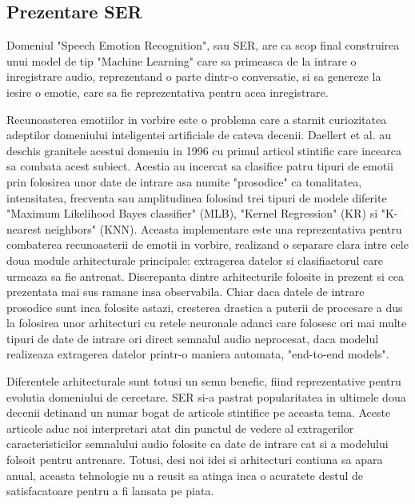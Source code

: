 \documentclass[a4paper,12pt, twoside]{book}
\begin{document}
			\subsection{Prezentare SER}
				Domeniul "Speech Emotion Recognition", sau SER, are ca scop final construirea unui model de tip "Machine Learning" care sa primeasca de la intrare o inregistrare audio, reprezentand o parte dintr-o conversatie, si sa genereze la iesire o emotie, care sa fie reprezentativa pentru acea inregistrare. \par
				Recunoasterea emotiilor in vorbire este o problema care a starnit curiozitatea adeptilor domeniului inteligentei artificiale de cateva decenii. Daellert et al. \cite{dellaert} au deschis granitele acestui domeniu in 1996 cu primul articol stintific care incearca sa combata acest subiect. Acestia au incercat sa clasifice patru tipuri de emotii prin folosirea unor date de intrare asa numite "prosodice" ca tonalitatea, intensitatea, frecventa sau amplitudinea folosind trei tipuri de modele diferite "Maximum Likelihood Bayes classifier" (MLB), "Kernel Regression"  (KR) si "K-nearest neighbors" (KNN). Aceasta implementare este una reprezentativa pentru combaterea recunoasterii de emotii in vorbire, realizand o separare clara intre cele doua module arhitecturale principale: extragerea datelor si clasifiactorul care urmeaza sa fie antrenat. Discrepanta dintre arhitecturile folosite in prezent si cea prezentata mai sus ramane insa observabila. Chiar daca datele de intrare prosodice sunt inca folosite astazi, cresterea drastica a puterii de procesare a dus la folosirea unor arhitecturi cu retele neuronale adanci care folosesc ori mai multe tipuri de date de intrare ori direct semnalul audio neprocesat, daca modelul realizeaza extragerea datelor printr-o maniera automata, "end-to-end models". \par		
				
				Diferentele arhitecturale sunt totusi un semn benefic, fiind reprezentative pentru evolutia domeniului de cercetare. SER si-a pastrat popularitatea in ultimele doua decenii detinand un numar bogat de articole stintifice pe aceasta tema. Aceste articole aduc noi interpretari atat din punctul de vedere al extragerilor caracteristicilor semnalului audio folosite ca date de intrare cat si a modelului folsoit pentru antrenare. Totusi, desi noi idei si arhitecturi contiuna sa apara anual, aceasta tehnologie nu a reusit sa atinga inca o acuratete destul de satisfacatoare pentru a fi lansata pe piata. \par
					
\end{document}
